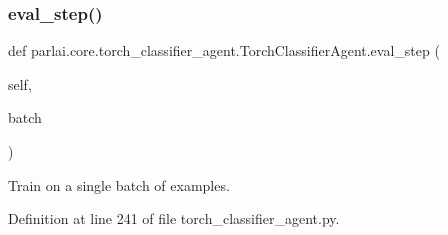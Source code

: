 \subsubsection{\texorpdfstring{eval\+\_\+step()}{eval\_step()}}
{\footnotesize\ttfamily def parlai.\+core.\+torch\+\_\+classifier\+\_\+agent.\+Torch\+Classifier\+Agent.\+eval\+\_\+step (\begin{DoxyParamCaption}\item[{}]{self,  }\item[{}]{batch }\end{DoxyParamCaption})}

\begin{DoxyVerb}Train on a single batch of examples.\end{DoxyVerb}
 

Definition at line 241 of file torch\+\_\+classifier\+\_\+agent.\+py.



